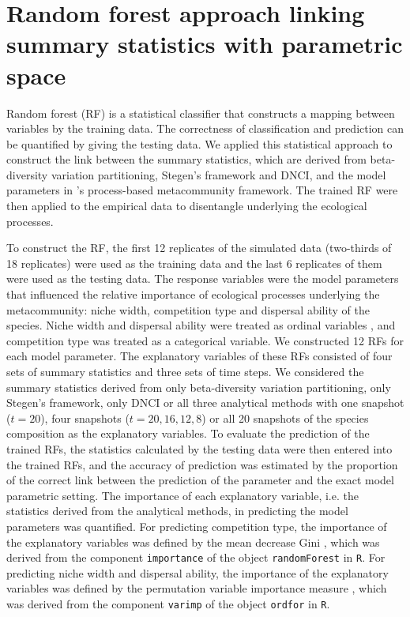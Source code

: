 \section{Random forest approach linking summary statistics with parametric space}
\noindent
Random forest (RF) is a statistical classifier that constructs a mapping between variables by the training data. The correctness of classification and prediction can be quantified by giving the testing data. We applied this statistical approach to construct the link between the summary statistics, which are derived from beta-diversity variation partitioning, Stegen's framework and DNCI, and the model parameters in \citeauthor{thompson2020process}'s process-based metacommunity framework. The trained RF were then applied to the empirical data to disentangle underlying the ecological processes.


To construct the RF, the first 12 replicates of the simulated data (two-thirds of 18 replicates) were used as the training data and the last 6 replicates of them were used as the testing data. The response variables were the model parameters that influenced the relative importance of ecological processes underlying the metacommunity: niche width, competition type and dispersal ability of the species. Niche width and dispersal ability were treated as ordinal variables \citep{hornung2020ordinal}, and competition type was treated as a categorical variable. We constructed 12 RFs for each model parameter. The explanatory variables of these RFs consisted of four sets of summary statistics and three sets of time steps. We considered the summary statistics derived from only beta-diversity variation partitioning, only Stegen's framework, only DNCI or all three analytical methods with one snapshot ($t = 20$), four snapshots ($t = 20, 16, 12, 8$) or all 20 snapshots of the species composition as the explanatory variables. To evaluate the prediction of the trained RFs, the statistics calculated by the testing data were then entered into the trained RFs, and the accuracy of prediction was estimated by the proportion of the correct link between the prediction of the parameter and the exact model parametric setting. The importance of each explanatory variable, i.e. the statistics derived from the analytical methods, in predicting the model parameters was quantified. For predicting competition type, the importance of the explanatory variables was defined by the mean decrease Gini \citep{han2016variable}, which was derived from the component \texttt{importance} of the object \texttt{randomForest} in \texttt{R}. For predicting niche width and dispersal ability, the importance of the explanatory variables was defined by the permutation variable importance measure \citep{janitza2016random}, which was derived from the component \texttt{varimp} of the object \texttt{ordfor} in \texttt{R}.

